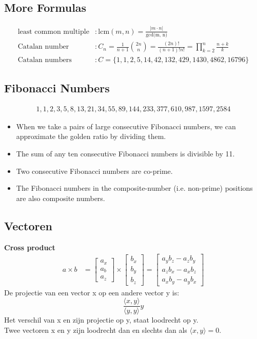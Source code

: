 \documentclass[a4paper, twocolumn]{article}
\begin{document}
\subsection*{More Formulas}
\begin{align*}
\text{least common multiple} &: \text{lcm}(m, n) = \frac{|m \cdot
	n|}{\text{gcd(m, n)}} \\
\text{Catalan number} &: C_n = \frac{1}{n+1}{2n \choose n} =
\frac{(2n)!}{(n+1)!n!} = \prod^n_{k=2}\frac{n+k}{k} \\
\text{Catalan numbers} &: C = \{1, 1, 2, 5, 14, 42, 132, 429, 1430, 4862,
16796\}
\end{align*}
\vspace{-1em}
\subsection*{Fibonacci Numbers}\vspace*{-1em}
\begin{align*}
1,1,2,3,5,8,13,21,34,55,89, 144, 233, 377, 610, 987, 1597, 2584
\end{align*}
\begin{itemize}
	\item  When we take a pairs of large consecutive Fibonacci numbers, we can
	approximate the golden ratio by dividing them.
	\item The sum of any ten consecutive Fibonacci numbers is divisible by 11.
	\item Two consecutive Fibonacci numbers are co-prime.
	\item The Fibonacci numbers in the composite-number (i.e. non-prime)
	positions are also composite numbers.
\end{itemize}
\subsection{Vectoren}
\textbf{Cross product}
\begin{align*}
a \times b &= \begin{bmatrix} a_x \\ a_b \\ a_z \end{bmatrix}
\times \begin{bmatrix} b_x \\ b_y \\ b_z \end{bmatrix} =
\begin{bmatrix} a_yb_z - a_zb_y \\ a_zb_x - a_xb_z \\ 
a_xb_y - a_yb_x \end{bmatrix}
\end{align*}
De projectie van een vector x op een andere vector y is:
$$\frac{\langle x,y \rangle}{\langle y,y \rangle} y$$
Het verschil van x en zijn projectie op y, staat loodrecht op y.\\
Twee vectoren x en y zijn loodrecht dan en slechts dan als $\langle x,y \rangle = 0$.\\
\end{document}
